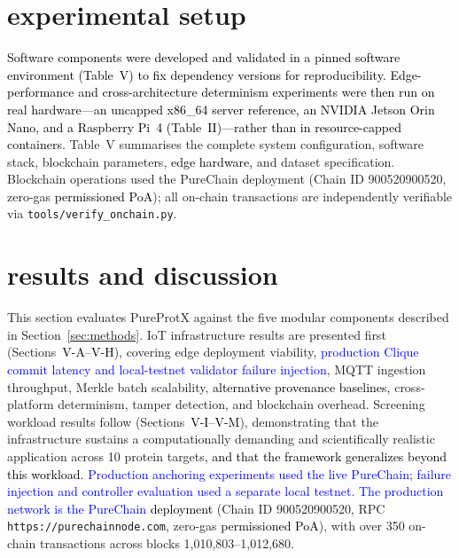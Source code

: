 \documentclass[conference]{IEEEtran}
\newcommand{\rev}[2]{\textcolor{blue}{#2}}
\begin{document}
\begin{table}[!htbp]
{\begin{tabular}{p{2.6cm} p{2.8cm} p{4.5cm}}
\bottomrule
\end{tabular}}
\end{table}
\section{\textbf{experimental setup}}
\label{sec:experiments}
\textcolor{black}{Software components were developed and validated in a pinned
software environment (Table~V) to fix dependency versions for reproducibility.
Edge-performance and cross-architecture determinism experiments were then run
on real hardware---an uncapped x86\_64 server reference, an NVIDIA Jetson
Orin Nano, and a Raspberry Pi~4 (Table~II)---rather than in resource-capped
containers.} Table~V summarises the complete system configuration, software
stack, blockchain parameters, \textcolor{black}{edge hardware,} and dataset
specification. Blockchain operations used the PureChain
deployment (Chain ID 900520900520, zero-gas \textcolor{black}{permissioned
PoA}); all on-chain transactions are independently verifiable via
\texttt{tools/verify\_onchain.py}.

\section{\textbf{results and discussion}}
\label{sec:results}

This section evaluates PureProtX against the five modular
components described in Section~\ref{sec:methods}.
IoT infrastructure results are presented first
(Sections~\textcolor{black}{V-A–V-H}), covering edge deployment viability,
\rev{R2.4}{production Clique commit latency and local-testnet validator failure injection}, MQTT
ingestion throughput, Merkle batch scalability, \textcolor{black}{alternative
provenance baselines,} cross-platform determinism, tamper detection, and
blockchain overhead. Screening workload results follow
(Sections~\textcolor{black}{V-I–V-M}), demonstrating that the infrastructure
sustains a computationally demanding and scientifically realistic application
across 10 protein targets\textcolor{black}{, and that the framework
generalizes beyond this workload}.
\rev{R1.3}{Production anchoring experiments used the live PureChain; failure injection and controller evaluation used a separate local testnet. The production network is the PureChain}
\textcolor{black}{deployment} (Chain ID 900520900520, RPC
\texttt{https://purechainnode.com}, zero-gas
\textcolor{black}{permissioned PoA}), with over 350 on-chain transactions
across blocks 1,010,803–1,012,680.
\end{document}
